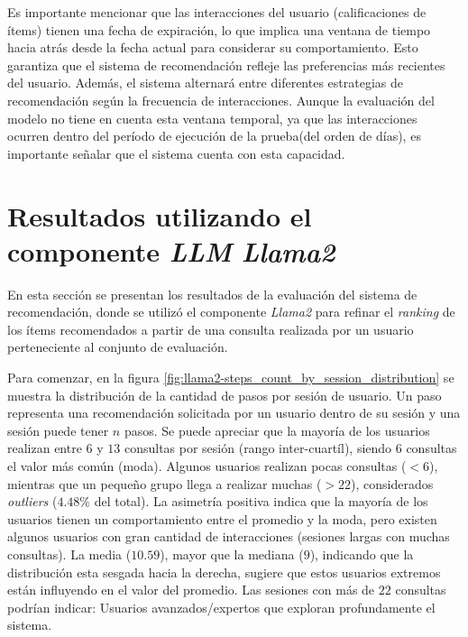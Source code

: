 \documentclass[11pt,a4paper,twoside]{thesis}
\begin{document}
Es importante mencionar que las interacciones del usuario (calificaciones de ítems) tienen una fecha de expiración, lo que implica una ventana de tiempo hacia atrás desde la fecha actual para considerar su comportamiento. Esto garantiza que el sistema de recomendación refleje las preferencias más recientes del usuario. Además, el sistema alternará entre diferentes estrategias de recomendación según la frecuencia de interacciones. Aunque la evaluación del modelo no tiene en cuenta esta ventana temporal, ya que las interacciones ocurren dentro del período de ejecución de la prueba(del orden de días), es importante señalar que el sistema cuenta con esta capacidad.

\chapter{Resultados utilizando el componente \textit{LLM} \textit{Llama2}}

En esta sección se presentan los resultados de la evaluación del sistema de recomendación, donde se utilizó el componente \textit{Llama2} para refinar el \textit{ranking} de los ítems recomendados a partir de una consulta realizada por un usuario perteneciente al conjunto de evaluación.

Para comenzar, en la figura \ref{fig:llama2-steps_count_by_session_distribution} se muestra la distribución de la cantidad de pasos por sesión de usuario. Un paso representa una recomendación solicitada por un usuario dentro de su sesión y una sesión puede tener $n$ pasos. Se puede apreciar que la mayoría de los usuarios realizan entre $6$ y $13$ consultas por sesión (rango inter-cuartíl), siendo $6$ consultas el valor más común (moda).
Algunos usuarios realizan pocas consultas ($<6$), mientras que un pequeño grupo llega a realizar muchas ($>22$), considerados \textit{outliers} ($4.48\%$ del total). La asimetría positiva indica que la mayoría de los usuarios tienen un comportamiento entre el promedio y la moda, pero existen algunos usuarios con gran cantidad de interacciones (sesiones largas con muchas consultas). La media ($10.59$), mayor que la mediana ($9$), indicando que la distribución esta sesgada hacia la derecha, sugiere que estos usuarios extremos están influyendo en el valor del promedio. Las sesiones con más de $22$ consultas podrían indicar: Usuarios avanzados/expertos que exploran profundamente el sistema.
\end{document}
